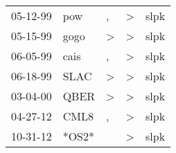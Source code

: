 \begin{supertabular}{p{0.07\textwidth}p{0.06\textwidth}p{0.02\textwidth}p{0.02\textwidth}p{0.06\textwidth}}
 05-12-99\textsuperscript{} &   pow\textsuperscript{} &             , &  \textgreater &  slpk\textsuperscript{} \\
 05-15-99\textsuperscript{} &  gogo\textsuperscript{} &  \textgreater &  \textgreater &  slpk\textsuperscript{} \\
 06-05-99\textsuperscript{} &  cais\textsuperscript{} &             , &  \textgreater &  slpk\textsuperscript{} \\
 06-18-99\textsuperscript{} &  SLAC\textsuperscript{} &  \textgreater &  \textgreater &  slpk\textsuperscript{} \\
 03-04-00\textsuperscript{} &  QBER\textsuperscript{} &  \textgreater &  \textgreater &  slpk\textsuperscript{} \\
 04-27-12\textsuperscript{} &  CML8\textsuperscript{} &             , &  \textgreater &  slpk\textsuperscript{} \\
 10-31-12\textsuperscript{} &                   *OS2* &               &  \textgreater &  slpk\textsuperscript{} \\
\end{supertabular}
